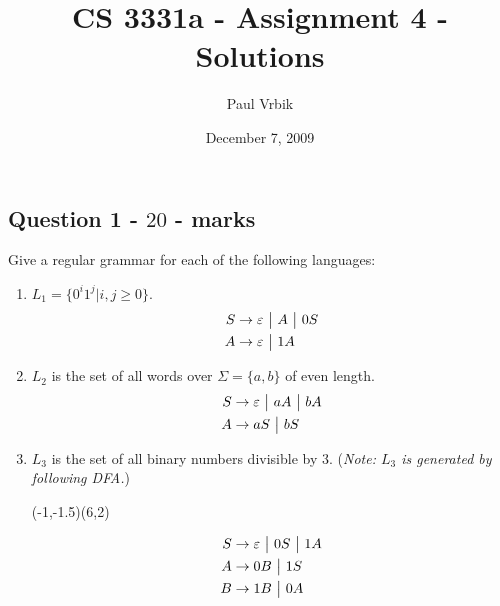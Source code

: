 \documentclass[12pt]{article}
\title{CS 3331a - Assignment 4 - Solutions}
\author{Paul Vrbik}
\date{December 7, 2009}
\begin{document}
 
\ShowFrame %

\maketitle
\subsection*{Question 1 - $20$ - marks}
Give a regular grammar for each of the following languages:
\begin{enumerate}
\item[(1)] $L_1 = \{ 0^i1^j | i,j \geq 0 \}$.
\begin{align*}
S &\rightarrow \varepsilon \text{ }\big|\text{ } A \text{ }\big|\text{ } 0S \\
A &\rightarrow \varepsilon \text{ }\big|\text{ } 1A
\end{align*}
\item[(2)] $L_2$ is the set of all words over $\Sigma = \{a,b\}$ of even length.
\begin{align*}
S &\rightarrow \varepsilon \text{ }\big|\text{ } aA \text{ }\big|\text{ } bA \\
A &\rightarrow aS \text{ }\big|\text{ } bS
\end{align*}
\item[(3)] $L_3$ is the set of all binary numbers divisible by $3$. (\small{\emph{Note: $L_3$ is generated by following DFA.}})

\begin{center}
\begin{VCPicture}{(-1,-1.5)(6,2)}
\SmallState


\end{VCPicture}
\end{center}

\begin{align*}
S &\rightarrow \varepsilon \text{ }\big|\text{ } 0S \text{ }\big|\text{ } 1A \\
A &\rightarrow 0B \text{ }\big|\text{ } 1S \\
B &\rightarrow 1B \text{ }\big|\text{ } 0A 
\end{align*}

\end{enumerate}
\end{document}
